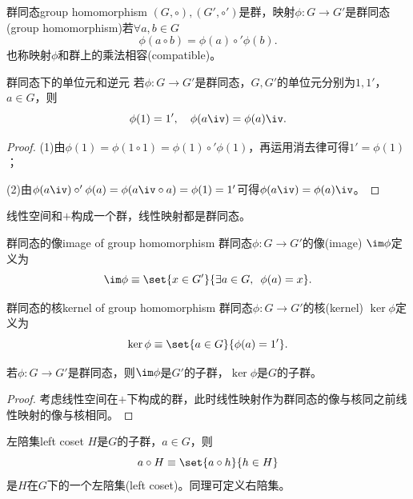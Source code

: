 \begin{definition}{群同态}{group homomorphism}
	$(G,\circ),(G',\circ')$是群，映射$\phi:G\to G'$是群同态(group homomorphism)若$\forall a,b\in G$
	\begin{equation}
		\phi(a\circ b)=\phi(a)\circ'\phi(b).
	\end{equation}
	也称映射$\phi$和群上的乘法相容(compatible)。
\end{definition}
\begin{theorem}{群同态下的单位元和逆元}{}
	若$\phi:G\to G'$是群同态，$G,G'$的单位元分别为$1,1'$，$a\in G$，则
	\begin{equation}
		\phi(1)=1',\quad \phi(a\iv)=\phi(a)\iv.
	\end{equation}
\end{theorem}
\begin{proof}
	(1)由$\phi(1)=\phi(1\circ 1)=\phi(1)\circ'\phi(1)$，再运用消去律可得$1'=\phi(1)$；

	(2)由$\phi(a\iv)\circ'\phi(a)=\phi(a\iv\circ a)=\phi(1)=1'$可得$\phi(a\iv)=\phi(a)\iv$。
\end{proof}
\begin{example}
	{}{}
	线性空间和$+$构成一个群，线性映射都是群同态。
\end{example}
\begin{definition}{群同态的像}{image of group homomorphism}
	群同态$\phi:G\to G'$的像(image) $\im\phi$定义为
	\begin{equation}
		\im\phi\equiv\set{x\in G'}{\exists a\in G,\enspace\phi(a)=x}.
	\end{equation}
\end{definition}
\begin{definition}{群同态的核}{kernel of group homomorphism}
	群同态$\phi:G\to G'$的核(kernel) $\ker\phi$定义为
	\begin{equation}
		\ker\phi\equiv\set{a\in G}{\phi(a)=1'}.
	\end{equation}
\end{definition}
\begin{theorem}{}{}
	若$\phi:G\to G'$是群同态，则$\im\phi$是$G'$的子群，$\ker\phi$是$G$的子群。
\end{theorem}
\begin{proof}
	考虑线性空间在$+$下构成的群，此时线性映射作为群同态的像与核同之前线性映射的像与核相同。
\end{proof}
\begin{definition}{左陪集}{left coset}
	$H$是$G$的子群，$a\in G$，则
	\begin{equation}
		a\circ H\equiv\set{a\circ h}{h\in H}
	\end{equation}
	是$H$在$G$下的一个左陪集(left coset)。同理可定义右陪集。
\end{definition}
